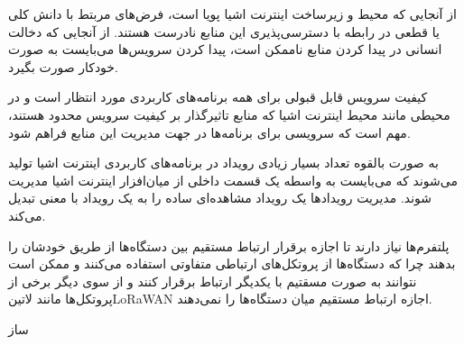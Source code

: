 \documentclass[]{./reports}
\begin{document}
از آنجایی که محیط و زیرساخت اینترنت اشیا پویا است، فرض‌های مربتط با دانش کلی یا قطعی در رابطه با دسترسی‌پذیری این
منابع نادرست هستند.
از آنجایی که دخالت انسانی در پیدا کردن منابع ناممکن است، پیدا کردن سرویس‌ها می‌بایست به صورت خودکار صورت بگیرد.


کیفیت سرویس قابل قبولی برای همه برنامه‌های کاربردی مورد انتظار است و در محیطی مانند محیط اینترنت اشیا که منابع تاثیرگذار بر کیفیت سرویس
محدود هستند، مهم است که سرویسی برای برنامه‌ها در جهت مدیریت این منابع فراهم شود.


به صورت بالقوه تعداد بسیار زیادی رویداد در برنامه‌های کاربردی اینترنت اشیا تولید می‌شوند
که می‌بایست به واسطه یک قسمت داخلی از میان‌افزار اینترنت اشیا مدیریت شوند.
مدیریت رویدادها یک رویداد مشاهده‌ای ساده را به یک رویداد با معنی تبدیل می‌کند.


پلتفرم‌ها نیاز دارند تا اجازه برقرار ارتباط مستقیم بین دستگاه‌ها از طریق خودشان را بدهند چرا که دستگاه‌ها از پروتکل‌های ارتباطی متفاوتی استفاده می‌کنند
و ممکن است نتوانند به صورت مسقتیم با یکدیگر ارتباط برقرار کنند و از سوی دیگر برخی از پروتکل‌ها مانند ‌لاتین{LoRaWAN} اجازه ارتباط مستقیم میان
دستگاه‌ها را نمی‌دهند.


‌ساز
\end{document}

